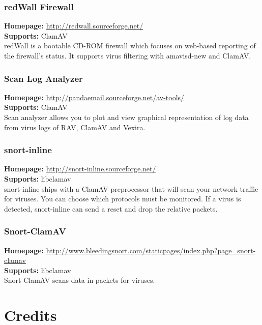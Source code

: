 \documentclass[a4paper,titlepage,12pt]{article}
\begin{document}
    \subsubsection{redWall Firewall}
    \textbf{Homepage:} \url{http://redwall.sourceforge.net/}\\
    \textbf{Supports:} ClamAV\\[4pt]
    redWall is a bootable CD-ROM firewall which focuses on web-based
    reporting of the firewall's status. It supports virus filtering with
    amavisd-new and ClamAV.

    \subsubsection{Scan Log Analyzer}
    \textbf{Homepage:} \url{http://pandaemail.sourceforge.net/av-tools/}\\
    \textbf{Supports:} ClamAV\\[4pt]
    Scan analyzer allows you to plot and view graphical representation of
    log data from virus logs of RAV, ClamAV and Vexira. 

    \subsubsection{snort-inline}
    \textbf{Homepage:} \url{http://snort-inline.sourceforge.net/}\\
    \textbf{Supports:} libclamav\\[4pt]
    snort-inline ships with a ClamAV preprocessor that will scan your network
    traffic for viruses. You can choose which protocols must be monitored. If
    a virus is detected, snort-inline can send a reset and drop the relative
    packets.

    \subsubsection{Snort-ClamAV}
    \textbf{Homepage:} \url{http://www.bleedingsnort.com/staticpages/index.php?page=snort-clamav}\\
    \textbf{Supports:} libclamav\\[4pt]
    Snort-ClamAV scans data in packets for viruses.

    \section{Credits}
\end{document}
